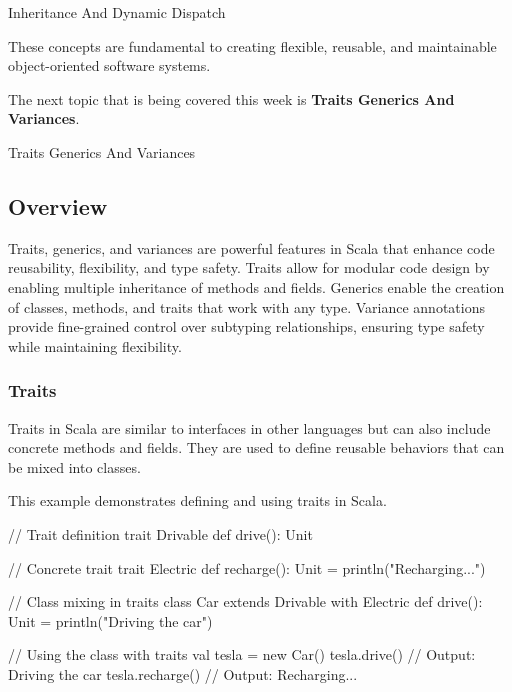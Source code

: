 \begin{notes}{Inheritance And Dynamic Dispatch}
\begin{highlight}
        These concepts are fundamental to creating flexible, reusable, and maintainable object-oriented software systems.
    
    \end{highlight}
\end{notes}

The next topic that is being covered this week is \textbf{Traits Generics And Variances}.

\begin{notes}{Traits Generics And Variances}
    \subsection*{Overview}

    Traits, generics, and variances are powerful features in Scala that enhance code reusability, flexibility, and type safety. Traits allow for modular code design by enabling multiple inheritance of 
    methods and fields. Generics enable the creation of classes, methods, and traits that work with any type. Variance annotations provide fine-grained control over subtyping relationships, ensuring 
    type safety while maintaining flexibility.
    
    \subsubsection*{Traits}
    
    Traits in Scala are similar to interfaces in other languages but can also include concrete methods and fields. They are used to define reusable behaviors that can be mixed into classes.
    
    \begin{highlight}[Traits]
    
        This example demonstrates defining and using traits in Scala.
    
    \begin{code}[Scala]
    // Trait definition
    trait Drivable {
        def drive(): Unit
    }
    
    // Concrete trait
    trait Electric {
        def recharge(): Unit = println("Recharging...")
    }
    
    // Class mixing in traits
    class Car extends Drivable with Electric {
        def drive(): Unit = println("Driving the car")
    }
    
    // Using the class with traits
    val tesla = new Car()
    tesla.drive()   // Output: Driving the car
    tesla.recharge() // Output: Recharging...
    \end{code}
    

\end{highlight}
\end{notes}

